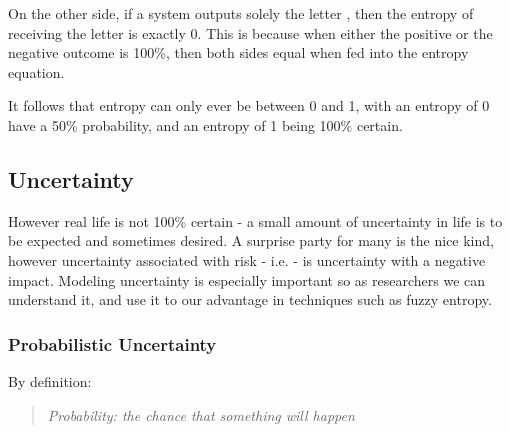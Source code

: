 On the other side, if a system outputs solely the letter , then the entropy of receiving the letter  is exactly 0. This is because when either the positive or the negative outcome is 100\%, then both sides equal  when fed into the entropy equation.
\begin{figure}[H]

\end{figure}

It follows that entropy can only ever be between 0 and 1, with an entropy of 0 have a 50\% probability, and an entropy of 1 being 100\% certain.

\subsection{Uncertainty}

However real life is not 100\% certain - a small amount of uncertainty in life is to be expected and sometimes desired. A surprise party for many is the nice kind, however uncertainty associated with risk - i.e.  - is uncertainty with a negative impact. Modeling uncertainty is especially important so as researchers we can understand it, and use it to our advantage in techniques such as fuzzy entropy.

\subsubsection{Probabilistic Uncertainty}

By definition:

\begin{quotation}
  \textit{Probability: the chance that something will happen \cite{PROBABILITY}}
\end{quotation}


